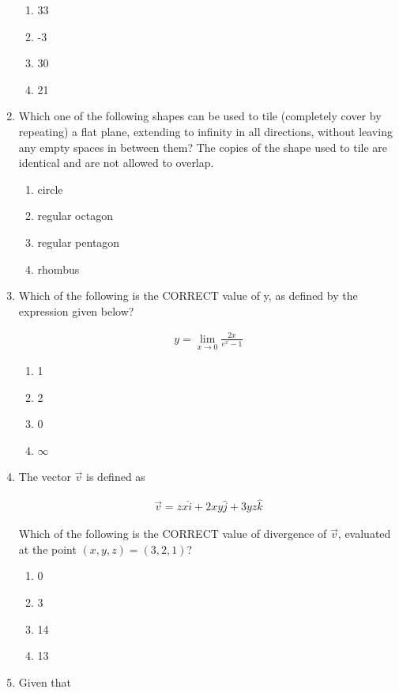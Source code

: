 \documentclass[journal,12pt,onecolumn]{IEEEtran}
\theoremstyle{remark}
\begin{document}
\begin{enumerate}
\hfill{}
\begin{enumerate}
    \item 33
    \item -3
    \item 30
    \item 21
\end{enumerate}

    \item Which one of the following shapes can be used to tile (completely cover by repeating) a flat plane, extending to infinity in all directions, without leaving any empty spaces in between them? The copies of the shape used to tile are identical and are not allowed to overlap.
    
\hfill{}
\begin{enumerate}
    \item circle 
    \item regular octagon 
    \item regular pentagon
    \item rhombus
\end{enumerate}

    \item Which of the following is the CORRECT value of y, as defined by the expression given below?

    \begin{align*}
        y = \lim_{x\to 0} \frac{2x}{e^x - 1}
    \end{align*}
    
\hfill{}
\begin{enumerate}
    \item 1
    \item 2
    \item 0
    \item $\infty$
\end{enumerate}

    \item The vector $\vec v$ is defined as 
    
    \begin{align*}
        \vec v = zx \hat{i} + 2xy \hat{j} + 3yz \hat{k}
    \end{align*} 

    Which of the following is the CORRECT value of divergence of $\vec v$, evaluated at the point $(x,y,z) = (3,2,1)$?

\hfill{}
\begin{enumerate}
    \item 0
    \item 3
    \item 14
    \item 13
\end{enumerate}
\newpage
    \item Given that 


\end{enumerate}
\end{document}
